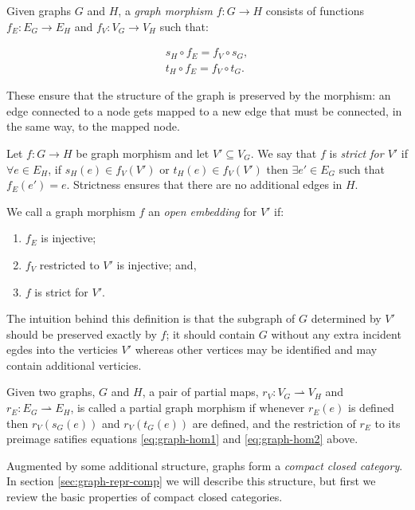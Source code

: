 \documentclass[runningheads]{llncs}
\begin{document}
Given graphs $G$ and $H$, a \emph{graph morphism} $f : G\to H$
consists of functions $f_E : E_G \to E_H$ and $f_V:V_G\to V_H$ such
that:

\begin{gather}
  s_H\circ f_E = f_V \circ s_G,\label{eq:graph-hom1}\\
  t_H\circ f_E = f_V \circ t_G\label{eq:graph-hom2}.
\end{gather}

\noindent These ensure that the structure of the graph is preserved by
the morphism: an edge connected to a node gets mapped to a new edge
that must be connected, in the same way, to the mapped node.

Let $f: G \to H$ be graph morphism and let $V' \subseteq V_G$. We say
that $f$ is \emph{strict for $V'$} if $\forall e \in E_H$, if $s_H(e)
\in f_V(V')$ or $t_H(e) \in f_V(V')$ then $\exists e' \in E_G$ such
that $f_E(e') = e$. Strictness ensures that there are no additional
edges in $H$.

\begin{definition}
\label{open-embedding-def}
We call a graph morphism $f$ an \emph{open embedding} for $V'$ if:
\begin{enumerate}
\item $f_E$ is injective;
\item $f_V$ restricted to $V'$ is injective; and,
\item $f$ is strict for $V'$.
\end{enumerate}
\end{definition}

\noindent The intuition behind this definition is that the subgraph of
$G$ determined by $V'$ should be preserved exactly by $f$; it should
contain $G$ without any extra incident egdes into the verticies $V'$
whereas other vertices may be identified and may contain additional
verticies.

Given two graphs, $G$ and $H$, a pair of partial maps, $r_V: V_G
\rightharpoonup V_H$ and $r_E: E_G \rightharpoonup E_H$, is called a
partial graph morphism if whenever $r_E(e)$ is defined then
$r_V(s_G(e))$ and $r_V(t_G(e))$ are defined, and the restriction of
$r_E$ to its preimage satifies equations \eqref{eq:graph-hom1} and
\eqref{eq:graph-hom2} above.

Augmented by some additional structure, graphs form a \emph{compact closed
category}.  In section \ref{sec:graph-repr-comp} we will describe this
structure, but first we review the basic properties of compact closed
categories.
\end{document}
